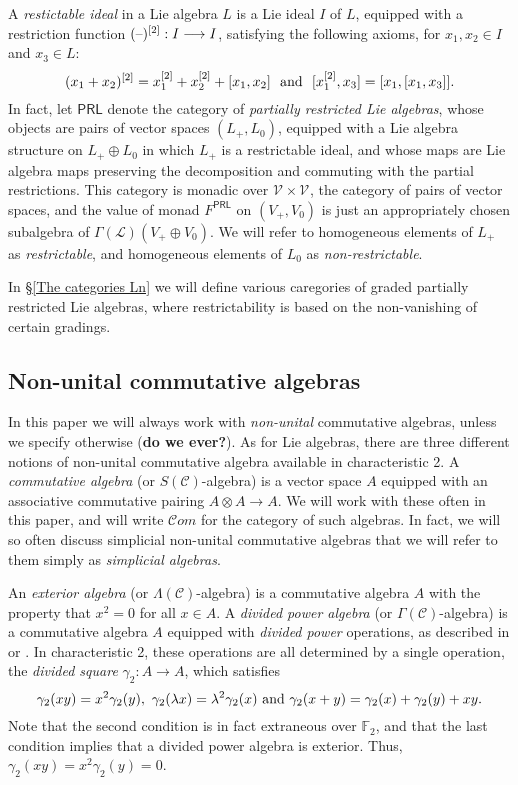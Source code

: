 \documentclass[11pt]{amsart}
\theoremstyle{plain}
\theoremstyle{definition}
\newcommand{\DASH}{\textup{--}}
\renewcommand{\to}{\longrightarrow}
\newcommand{\scrL}{\mathscr{L}}
\newcommand{\scrC}{\mathscr{C}}
\newcommand{\calV}{\mathcal{V}}
\theoremstyle{plain}
\newcommand{\LieOperad}{{\scrL}}
\newcommand{\CommOperad}{{\scrC}}
\newcommand{\restn}[1]{#1^{[2]}}
\newcommand{\vect}[2]{\calV^{#1}_{#2}}
\newcommand{\F}{\mathbb{F}}
\newcommand{\algs}{{\scrC\!\textit{om}}}
\newcommand{\Ftwo}{\F_2}
\begin{document}
\begin{Conventions and notation}
A \emph{restictable ideal} in a Lie algebra $L$ is a Lie ideal $I$ of $L$, equipped with a restriction function $\restn{(\DASH)}:I\to I$, satisfying the following axioms, for $x_1,x_2\in I$ and $x_3\in L$:
\[\restn{(x_1+x_2)}=\restn{x_1}+\restn{x_2}+[x_1,x_2]\textup{ \ and \ }[\restn{x_1},x_3]=[x_1,[x_1,x_3]].\]
In fact, let $\mathsf{PRL}$ denote the category of \emph{partially restricted Lie algebras}, whose objects are pairs of vector spaces $(L_+,L_0)$, equipped with a Lie algebra structure on $L_+\oplus L_0$ in which $L_+$ is a restrictable ideal, and whose maps are Lie algebra maps preserving the decomposition and commuting with the partial restrictions. This category is monadic over $\vect{}{}\times\vect{}{}$, the category of pairs of vector spaces, and the value of monad $F^{\mathsf{PRL}}$  on $(V_+,V_0)$ is just an appropriately chosen subalgebra of $\Gamma(\LieOperad)(V_+\oplus V_0)$. We will refer to homogeneous elements of $L_+$ as \emph{restrictable}, and homogeneous elements of $L_0$ as \emph{non-restrictable}.

In \S\ref{The categories Ln} we will define various caregories of graded partially restricted Lie algebras, where restrictability is based on the non-vanishing of certain gradings.


\subsection{Non-unital commutative algebras}
In this paper we will always work with \emph{non-unital} commutative algebras, unless we specify otherwise (\textbf{do we ever?}). As for Lie algebras, there are three different notions of non-unital commutative algebra available in characteristic 2. A \emph{commutative algebra} (or $S(\CommOperad)$-algebra) is a vector space $A$ equipped with an associative commutative pairing $A\otimes A\to A$.  We will work with these often in this paper, and will write $\algs$ for the category of such algebras. In fact, we will so often discuss simplicial non-unital commutative algebras that we will refer to them simply as \emph{simplicial algebras}.

An \emph{exterior algebra} (or $\Lambda(\CommOperad)$-algebra) is a commutative algebra $A$ with the property that $x^2=0$ for all $x\in A$. A \emph{divided power algebra} (or $\Gamma(\CommOperad)$-algebra) is a commutative algebra $A$ equipped with \emph{divided power} operations, as described in \cite[1.2.2]{FresseSimplicialAlgs.pdf} or \cite[\S2]{MR1089001}. In characteristic 2, these operations are all determined by a single operation, the \emph{divided square} $\gamma_2:A\to A$, which satisfies
\[\gamma_2(xy)=x^2\gamma_2(y),\ \gamma_2(\lambda x)=\lambda^2\gamma_2(x)\textup{ and }\gamma_2(x+y)=\gamma_2(x)+\gamma_2(y)+xy.\]
Note that the second condition is in fact extraneous over $\Ftwo $, and that the last condition implies that a divided power algebra is exterior. Thus, $\gamma_2(xy)=x^2\gamma_2(y)=0$.


\end{Conventions and notation}
\end{document}

